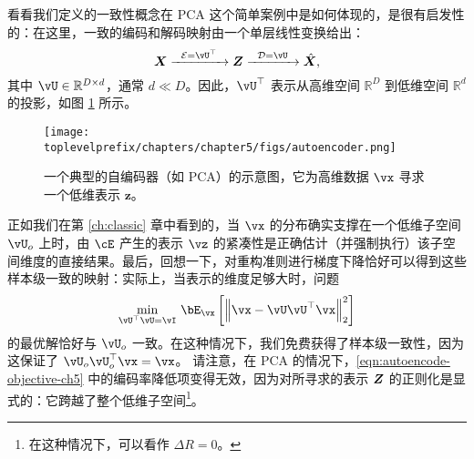 \documentclass[../../book-main_zh.tex]{subfiles}
\begin{document}
看看我们定义的一致性概念在 PCA 这个简单案例中是如何体现的，是很有启发性的：在这里，一致的编码和解码映射由一个单层线性变换给出：
\begin{equation}
  \X \xrightarrow{\hspace{2mm} \mathcal{E} = \vU^\top \hspace{2mm}}
  \Z \xrightarrow{\hspace{2mm} \mathcal{D} = \vU \hspace{2mm}}   \hat{\X},
  \label{eqn:autoencoding-PCA-2}
\end{equation}
其中 $\vU \in \mathbb{R}^{D\times d}$，通常 $d\ll D$。因此，$\vU^\top$ 表示从高维空间 $\mathbb{R}^{D}$ 到低维空间 $\mathbb{R}^{d}$ 的投影，如图 \ref{fig:AE} 所示。
\begin{figure}
  \centering \texttt{[image: \\toplevelprefix/chapters/chapter5/figs/autoencoder.png]}
  \caption{一个典型的自编码器（如 PCA）的示意图，它为高维数据 $\vx$ 寻求一个低维表示 $\bm{z}$。}
  \label{fig:AE}
\end{figure}

正如我们在第 \ref{ch:classic} 章中看到的，当 $\vx$ 的分布确实支撑在一个低维子空间 $\vU_o$ 上时，由 $\cE$ 产生的表示 $\vz$ 的紧凑性是正确估计（并强制执行）该子空间维度的直接结果。最后，回想一下，对重构准则进行梯度下降恰好可以得到这些样本级一致的映射：实际上，当表示的维度足够大时，问题
\begin{equation}\label{eq:pca-reconstruction-ch5}
  \min_{\vU^\top \vU = \vI}\, \bE_{\vx}\left[\norm*{\vx
  - \vU\vU^\top \vx}_2^2\right]
\end{equation}
的最优解恰好与 $\vU_o$ 一致。在这种情况下，我们免费获得了样本级一致性，因为这保证了 $\vU_o\vU_o^\top \vx = \vx$。
请注意，在 PCA 的情况下，\eqref{eqn:autoencode-objective-ch5} 中的编码率降低项变得无效，因为对所寻求的表示 $\bm{Z}$ 的正则化是显式的：它跨越了整个低维子空间\footnote{在这种情况下，可以看作 $\Delta R = 0$。}。
\end{document}
